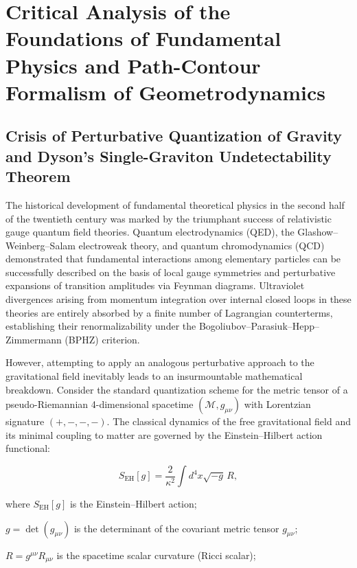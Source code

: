 \documentclass[11pt,a4paper]{article}
\theoremstyle{definition}
\begin{document}
\section{Critical Analysis of the Foundations of Fundamental Physics and Path-Contour Formalism of Geometrodynamics}\label{sec:rozdil1}

\subsection{Crisis of Perturbative Quantization of Gravity and Dyson's Single-Graviton Undetectability Theorem}\label{sec:1.1}

The historical development of fundamental theoretical physics in the second half of the twentieth century was marked by the triumphant success of relativistic gauge quantum field theories. Quantum electrodynamics (QED), the Glashow--Weinberg--Salam electroweak theory, and quantum chromodynamics (QCD) demonstrated that fundamental interactions among elementary particles can be successfully described on the basis of local gauge symmetries and perturbative expansions of transition amplitudes via Feynman diagrams. Ultraviolet divergences arising from momentum integration over internal closed loops in these theories are entirely absorbed by a finite number of Lagrangian counterterms, establishing their renormalizability under the Bogoliubov--Parasiuk--Hepp--Zimmermann (BPHZ) criterion.

However, attempting to apply an analogous perturbative approach to the gravitational field inevitably leads to an insurmountable mathematical breakdown. Consider the standard quantization scheme for the metric tensor of a pseudo-Riemannian 4-dimensional spacetime $(\mathcal{M}, g_{\mu\nu})$ with Lorentzian signature $(+,-,-,-)$. The classical dynamics of the free gravitational field and its minimal coupling to matter are governed by the Einstein--Hilbert action functional:

\begin{equation}\label{eq:1.1}\tag{1.1}
S_{\text{EH}}[g] = \frac{2}{\kappa^2} \int d^4x \sqrt{-g} \, R,
\end{equation}

where $S_{\text{EH}}[g]$ is the Einstein--Hilbert action;  

$g = \det(g_{\mu\nu})$ is the determinant of the covariant metric tensor $g_{\mu\nu}$;  

$R = g^{\mu\nu} R_{\mu\nu}$ is the spacetime scalar curvature (Ricci scalar);  
\end{document}
